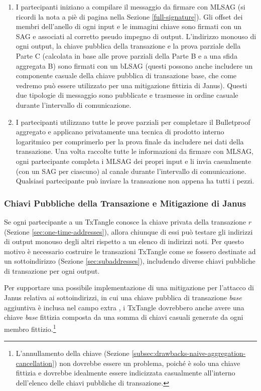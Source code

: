 \begin{enumerate}
    \item I partecipanti iniziano a compilare il messaggio da firmare con MLSAG (si ricordi la nota a piè di pagina nella Sezione \ref{full-signature}). Gli offset dei membri dell'anello di ogni input e le immagini chiave sono firmati con un SAG e associati al corretto pseudo impegno di output. L'indirizzo monouso di ogni output, la chiave pubblica della transazione e la prova parziale della Parte C (calcolata in base alle prove parziali della Parte B e a una sfida aggregata B) sono firmati con un bLSAG (questi possono anche includere un componente casuale della chiave pubblica di transazione base, che come vedremo può essere utilizzato per una mitigazione fittizia di Janus). Questi due tipologie di messaggio sono pubblicate e trasmesse in ordine casuale durante l'intervallo di comunicazione. 
    \item I partecipanti utilizzano tutte le prove parziali per completare il Bulletproof aggregato e applicano privatamente una tecnica di prodotto interno logaritmico per comprimerlo per la prova finale da includere nei dati della transazione. Una volta raccolte tutte le informazioni da firmare con MLSAG, ogni partecipante completa i MLSAG dei propri input e li invia casualmente (con un SAG per ciascuno) al canale durante l'intervallo di comunicazione. Qualsiasi partecipante può inviare la transazione non appena ha tutti i pezzi.
\end{enumerate}{}

\subsubsection*{Chiavi Pubbliche della Transazione e Mitigazione di Janus}

Se ogni partecipante a un TxTangle conosce la chiave privata della transazione $r$ (Sezione \ref{sec:one-time-addresses}), allora chiunque di essi può testare gli indirizzi di output monouso degli altri rispetto a un elenco di indirizzi noti. Per questo motivo è necessario costruire le transazioni TxTangle come se fossero destinate ad un sottoindirizzo (Sezione \ref{sec:subaddresses}), includendo diverse chiavi pubbliche di transazione per ogni output.

Per supportare una possibile implementazione di una mitigazione per l'attacco di Janus relativa ai sottoindirizzi, in cui una chiave pubblica di transazione \emph{base} aggiuntiva è inclusa nel campo extra \cite{janus-mitigation-issue-62}, i TxTangle dovrebbero anche avere una chiave \emph{base} fittizia composta da una somma di chiavi casuali generate da ogni membro fittizio.\footnote{L'annullamento della chiave (Sezione \ref{subsec:drawbacks-naive-aggregation-cancellation}) non dovrebbe essere un problema, poiché è solo una chiave fittizia e dovrebbe idealmente essere indicizzata casualmente all'interno dell'elenco delle chiavi pubbliche di transazione.}


